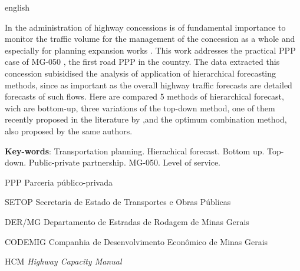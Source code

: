\documentclass[
	12pt,				%
	openright,			%
	twoside,			%
	a4paper,			%
	english,			%
	french,				%
	spanish,			%
	brazil				%
	]{abntex2}
\begin{document}
\begin{resumo}[Abstract]
 \begin{otherlanguage*}{english}

In the administration of highway concessions is of fundamental importance to monitor the traffic volume for the management of the concession as a whole and especially for planning expansion works . This work addresses the practical PPP case of MG-050 , the first road PPP in the country. The data extracted this concession subisidised the analysis of application of hierarchical forecasting methods, since as important as the overall highway traffic forecasts are detailed forecasts of such flows.
Here are compared 5 methods of hierarchical forecast, wich are  bottom-up, three variations of the top-down method, one of them recently proposed in the literature by  ,and the optimum combination method, also proposed by the same authors.


   \vspace{\onelineskip}
 
   \noindent 
   \textbf{Key-words}: Transportation planning. Hierachical forecast. Bottom up. Top-down. Public-private partnership. MG-050. Level of service.
 \end{otherlanguage*}
\end{resumo}


\listoffigures*
\cleardoublepage

\listoftables*
\cleardoublepage

\begin{siglas}
 \item[PPP] Parceria público-privada
 \item[SETOP] Secretaria de Estado de Transportes e Obras Públicas
 \item[DER/MG] Departamento de Estradas de Rodagem de Minas Gerais 
 \item[CODEMIG] Companhia de Desenvolvimento Econômico de Minas Gerais
 \item[HCM] \emph{Highway Capacity Manual}

\end{siglas}

\end{document}
